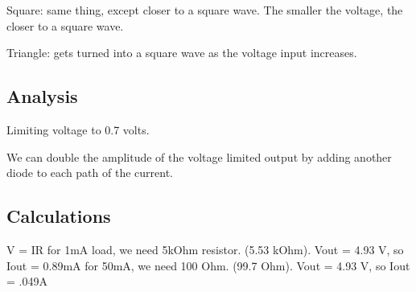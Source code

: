 \documentclass[12pt,letterpaper]{report}
\begin{document}
Square: same thing, except closer to a square wave. The smaller the voltage, the closer to a square wave.

Triangle: gets turned into a square wave as the voltage input increases. 

\subsection*{Analysis}

Limiting voltage to 0.7 volts. 

We can double the amplitude of the voltage limited output by adding another diode to each path of the current. 

\subsection*{Calculations}

V = IR
for 1mA load, we need 5kOhm resistor. (5.53 kOhm). Vout = 4.93 V, so Iout = 0.89mA
for 50mA, we need 100 Ohm. (99.7 Ohm). Vout = 4.93 V, so Iout = .049A
\end{document}
